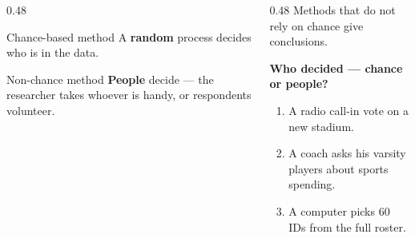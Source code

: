 \documentclass[aspectratio=169, 11pt]{beamer}
\begin{document}
\begin{frame}[t, plain]
  \vspace{2pt}
  \begin{columns}[t]
    \begin{column}{0.48\textwidth}
      \begin{block}{Chance-based method}
        A \textbf{random} process decides who is in the data.
      \end{block}
      \vspace{3pt}
      \begin{block}{Non-chance method}
        \textbf{People} decide --- the researcher takes whoever is handy, or respondents
        volunteer.
      \end{block}
    \end{column}
    \begin{column}{0.48\textwidth}
      Methods that do not rely on chance give  conclusions.
      \vspace{8pt}

      {\small\textbf{Who decided --- chance or people?}}
      \begin{enumerate}\setlength{\itemsep}{3pt}\small
        \item A radio call-in vote on a new stadium.
        \item A coach asks his varsity players about sports spending.
        \item A computer picks 60 IDs from the full roster.
      \end{enumerate}
    \end{column}
  \end{columns}
\end{frame}
\end{document}
